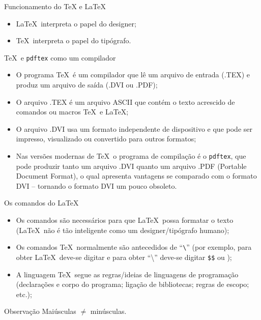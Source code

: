 \begin{frame}{Funcionamento do \TeX{} e \LaTeX}
\begin{itemize}
\item \LaTeX\ interpreta o papel do designer;
\item \TeX\ interpreta o papel do tipógrafo.
\end{itemize}
\end{frame}

\begin{frame}{\TeX\ e \texttt{pdftex} como um compilador}
\begin{itemize}
\item O programa \TeX\ é um compilador que lê um arquivo de entrada (.TEX) e produz um arquivo de saída (.DVI ou .PDF);
\item O arquivo .TEX é um arquivo ASCII que contém o texto acrescido de comandos ou macros \TeX\ e \LaTeX;
\item O arquivo .DVI usa um formato independente de dispositivo e que pode ser impresso, visualizado ou convertido para outros formatos;
\item Nas versões modernas de \TeX\ o programa de compilação é o \texttt{pdftex}, que pode produzir tanto um arquivo .DVI quanto um arquivo .PDF (Portable Document Format), o qual apresenta vantagens se comparado com o formato DVI -- tornando o formato DVI um pouco obsoleto.
\end{itemize}
\end{frame}

\begin{frame}{Os comandos do \LaTeX}
\begin{itemize}
	\item Os comandos são necessários para que \LaTeX\ possa formatar o texto 
	(\LaTeX\ não é tão inteligente como um designer/tipógrafo humano);
	\item Os comandos \TeX\ normalmente são antecedidos de 
	``\texttt{\textbackslash}'' (por exemplo, para obter \LaTeX\ deve-se digitar 
	 e para obter ``\textbackslash'' 	deve-se digitar 
	\texttt{\$}\texttt{\$} ou );
	\item A linguagem \TeX\ segue as regras/ideias de linguagens de programação 
	(declarações e corpo do programa; ligação de bibliotecas; regras de escopo; 
	etc.);
\end{itemize}
	
    \begin{block}{Observação}
    Maiúsculas $\neq$ minúsculas.
    \end{block}
\end{frame}

